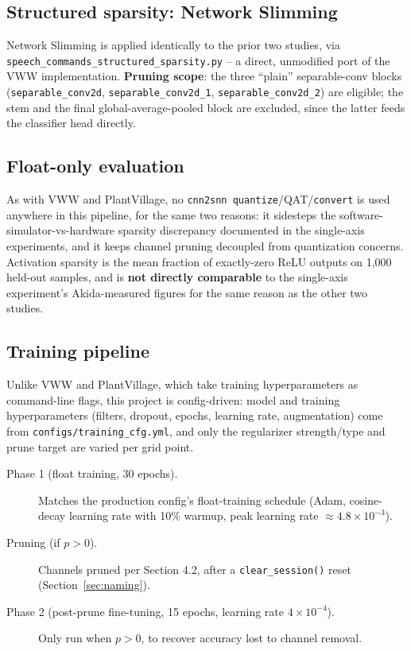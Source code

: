 \documentclass[11pt]{article}
\newcommand{\code}[1]{\texttt{#1}}
\begin{document}
\subsection{Structured sparsity: Network Slimming}

Network Slimming \cite{networkslimming} is applied identically to the prior two studies, via \code{speech\_\allowbreak commands\_\allowbreak structured\_\allowbreak sparsity.\allowbreak py} -- a direct, unmodified port of the VWW implementation. \textbf{Pruning scope}: the three ``plain'' separable-conv blocks (\code{separable\_conv2d}, \code{separable\_conv2d\_1}, \code{separable\_conv2d\_2}) are eligible; the stem and the final global-average-pooled block are excluded, since the latter feeds the classifier head directly.

\subsection{Float-only evaluation}

As with VWW and PlantVillage, no \code{cnn2snn quantize}/QAT/\code{convert} is used anywhere in this pipeline, for the same two reasons: it sidesteps the software-simulator-vs-hardware sparsity discrepancy documented in the single-axis experiments, and it keeps channel pruning decoupled from quantization concerns. Activation sparsity is the mean fraction of exactly-zero ReLU outputs on 1{,}000 held-out samples, and is \textbf{not directly comparable} to the single-axis experiment's Akida-measured figures for the same reason as the other two studies.

\subsection{Training pipeline}

Unlike VWW and PlantVillage, which take training hyperparameters as command-line flags, this project is config-driven: model and training hyperparameters (filters, dropout, epochs, learning rate, augmentation) come from \code{configs/training\_cfg.yml}, and only the regularizer strength/type and prune target are varied per grid point.

\begin{description}
    \item[Phase 1 (float training, 30 epochs).] Matches the production config's float-training schedule (Adam, cosine-decay learning rate with 10\% warmup, peak learning rate $\approx4.8\times10^{-3}$).
    \item[Pruning (if $p>0$).] Channels pruned per Section 4.2, after a \code{clear\_session()} reset (Section~\ref{sec:naming}).
    \item[Phase 2 (post-prune fine-tuning, 15 epochs, learning rate $4\times10^{-4}$).] Only run when $p>0$, to recover accuracy lost to channel removal.
\end{description}
\end{document}

